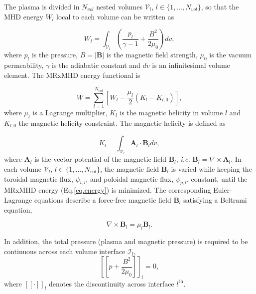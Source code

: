 \documentclass[my_thesis.tex]{subfiles}
\begin{document}
The plasma is divided in $N_{vol}$ nested volumes $\mathcal{V}_l$, $l\in\{1,\ldots,N_{vol}\}$, so that the MHD energy $W_l$ \citep{kruskal_equilibrium_1958} local to each volume can be written as

\begin{equation}
	W_l = \int_{\mathcal{V}_l} \left(\frac{p_l}{\gamma-1}+\frac{B^2}{2\mu_0}\right)dv,
\end{equation}
where $p_l$ is the pressure, $B=|\mathbf{B}|$ is the magnetic field strength, $\mu_0$ is the vacuum permeability, $\gamma$ is the adiabatic constant and $dv$ is an infinitesimal volume element. The \ac{MRxMHD} energy functional is \citep{Hudson2012}

\begin{equation}
	W = \sum_{l=1}^{N_{vol}} \left[W_l -\frac{\mu_l}{2}(K_l-K_{l,0})\right], \label{eq.energy}
\end{equation}
where $\mu_l$ is a Lagrange multiplier, $K_l$ is the magnetic helicity in volume $l$ and $K_{l,0}$ the magnetic helicity constraint. The magnetic helicity is defined as 

\begin{equation}
	K_l = \int_{\mathcal{V}_l} \mathbf{A}_l\cdot \mathbf{B}_l dv,
\end{equation}
where $\mathbf{A}_l$ is the vector potential of the magnetic field  $\mathbf{B}_l$, \textit{i.e.} $\mathbf{B}_l=\nabla\times\mathbf{A}_l$. In each volume $\mathcal{V}_l$, $l\in\{1,\ldots,N_{vol}\}$, the magnetic field $\mathbf{B}_l$ is varied while keeping the toroidal magnetic flux, $\psi_{t,l}$, and poloidal magnetic flux, $\psi_{p,l}$, constant, until the \ac{MRxMHD} energy (Eq.\ref{eq.energy}) is minimized. The corresponding Euler-Lagrange equations \citep{Hudson2012} describe a force-free magnetic field $\mathbf{B}_l$ satisfying a Beltrami equation,

\begin{equation}
	\nabla\times\mathbf{B}_l = \mu_l\mathbf{B}_l. \label{eq.BeltramiEquation}
\end{equation}


\noindent In addition, the total pressure (plasma and magnetic pressure) is required to be continuous across each volume interface $\mathcal{I}_l$,
\begin{equation}
	\left[\left[p + \frac{B^2}{2\mu_0}\right]\right]_l = 0, \label{eq.force_balance}
\end{equation}
where $[[\cdot]]_l$ denotes the discontinuity across interface $l^{\text{th}}$.
\end{document}
